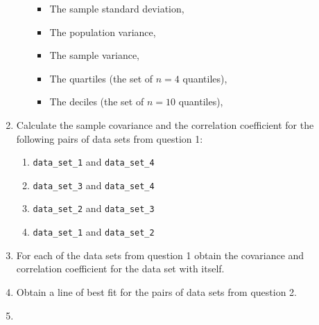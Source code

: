 \begin{enumerate}
\begin{enumerate}
\begin{itemize}
\item 

The sample standard deviation,

\item 

The population variance,

\item 

The sample variance,

\item 

The quartiles (the set of \(n=4\) quantiles),

\item 

The deciles (the set of \(n=10\) quantiles),

\end{itemize}

\end{enumerate}

\item 

Calculate the sample covariance and the correlation coefficient for the
following pairs of data sets from question 1:
\begin{enumerate}

\item 

\texttt{data\_set\_1} and \texttt{data\_set\_4}

\item 

\texttt{data\_set\_3} and \texttt{data\_set\_4}

\item 

\texttt{data\_set\_2} and \texttt{data\_set\_3}

\item 

\texttt{data\_set\_1} and \texttt{data\_set\_2}

\end{enumerate}

\item 

For each of the data sets from question 1 obtain the covariance and
correlation coefficient for the data set with itself.

\item 

Obtain a line of best fit for the pairs of data sets from question 2.

\item 


\end{enumerate}
